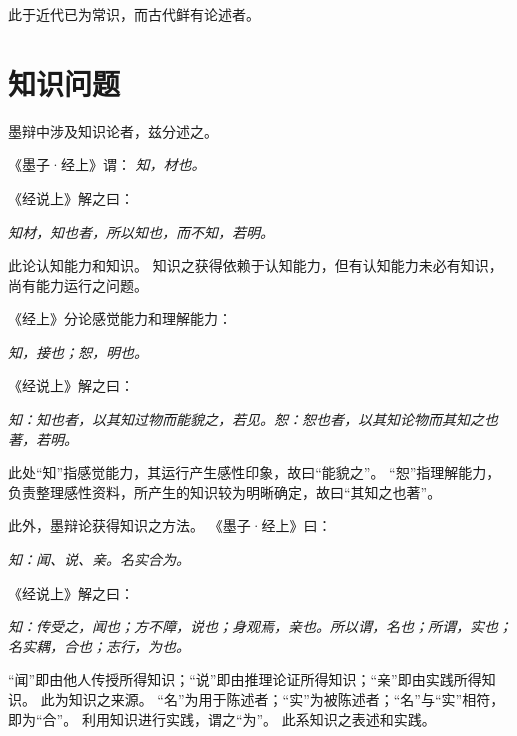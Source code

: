 \documentclass[11pt]{article}
\begin{document}
此于近代已为常识，而古代鲜有论述者。

\section{知识问题}
墨辩中涉及知识论者，兹分述之。

\newline

《墨子·经上》谓：
\textit{知，材也。}

《经说上》解之曰：

\textit{知材，知也者，所以知也，而不知，若明。}

此论认知能力和知识。
知识之获得依赖于认知能力，但有认知能力未必有知识，尚有能力运行之问题。

\newline

《经上》分论感觉能力和理解能力：

\textit{知，接也；恕，明也。}

《经说上》解之曰：

\textit{知：知也者，以其知过物而能貌之，若见。恕：恕也者，以其知论物而其知之也著，若明。}

此处“知”指感觉能力，其运行产生感性印象，故曰“能貌之”。
“恕”指理解能力，负责整理感性资料，所产生的知识较为明晰确定，故曰“其知之也著”。

\newline

此外，墨辩论获得知识之方法。
《墨子·经上》曰：

\textit{知：闻、说、亲。名实合为。}

《经说上》解之曰：

\textit{知：传受之，闻也；方不障，说也；身观焉，亲也。所以谓，名也；所谓，实也；名实耦，合也；志行，为也。}

“闻”即由他人传授所得知识；“说”即由推理论证所得知识；“亲”即由实践所得知识。
此为知识之来源。
“名”为用于陈述者；“实”为被陈述者；“名”与“实”相符，即为“合”。
利用知识进行实践，谓之“为”。
此系知识之表述和实践。
  
\end{document}
